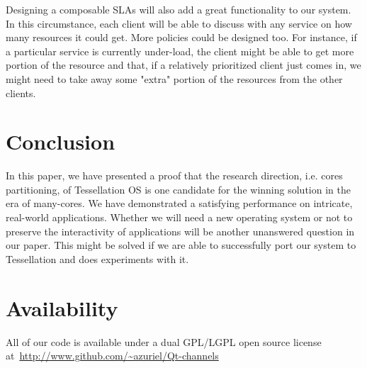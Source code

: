 \documentclass[letterpaper,twocolumn,11pt]{article}
\begin{document}
Designing a composable SLAs will also add a great functionality to our system. In this circumstance, each client will be able to discuss with any service on how many resources it could get. More policies could be designed too. For instance, if a particular service is currently under-load, the client might be able to get more portion of the resource and that, if a relatively prioritized client just comes in, we might need to take away some "extra" portion of the resources from the other clients.

\section{Conclusion}

In this paper, we have presented a proof that the research direction, i.e. cores partitioning, of Tessellation OS is one candidate for the winning solution in the era of many-cores. We have demonstrated a satisfying performance on intricate, real-world applications. Whether we will need a new operating system or not to preserve the interactivity of applications will be another unanswered question in our paper. This might be solved if we are able to successfully port our system to Tessellation and does experiments with it.

\section{Availability}

All of our code is available under a dual GPL/LGPL open source license at~\url{http://www.github.com/~azuriel/Qt-channels}

\footnotesize{
}

\theendnotes
\end{document}
